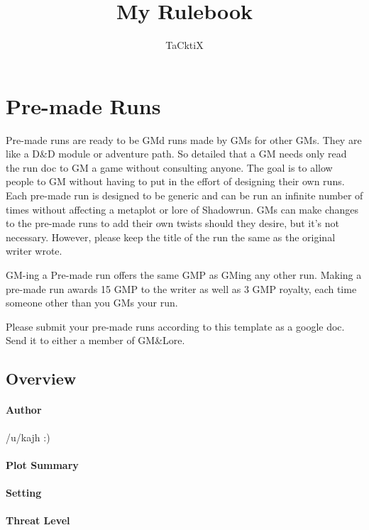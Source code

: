 \documentclass{ShadowTeXSR5}
\title{My Rulebook}
\author{TaCktiX}
\begin{document}
\srmaketitle[black]
\tableofcontents


\chapter{Pre-made Runs}

Pre-made runs are ready to be GMd runs made by GMs for other GMs. They are like a D\&D module or adventure path. So detailed that a GM needs only read the run doc to GM a game without consulting anyone. The goal is to allow people to GM without having to put in the effort of designing their own runs. Each pre-made run is designed to be generic and can be run an infinite number of times without affecting a metaplot or lore of Shadowrun. GMs can make changes to the pre-made runs to add their own twists should they desire, but it's not necessary. However, please keep the title of the run the same as the original writer wrote.

GM-ing a Pre-made run offers the same GMP as GMing any other run. Making a pre-made run awards 15 GMP to the writer as well as 3 GMP royalty, each time someone other than you GMs your run.

Please submit your pre-made runs according to this template as a google doc. Send it to either a member of GM\&Lore.


\section{Overview}
\subsubsection{Author}
/u/kajh :)
\subsubsection{Plot Summary}
\lipsum[1]
\subsubsection{Setting}
\lipsum[1]
\subsubsection{Threat Level}
\lipsum[1]
\end{document}

